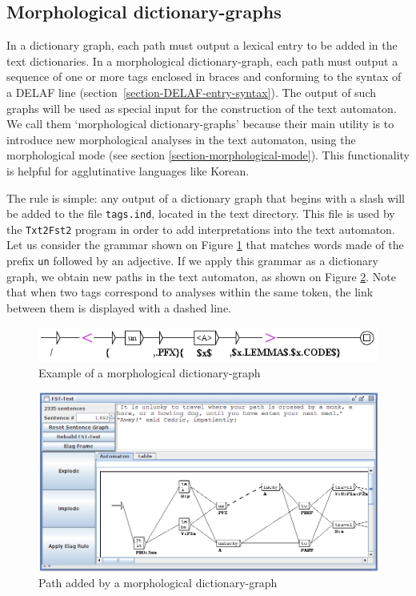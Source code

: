 \subsection{Morphological dictionary-graphs}
In a dictionary graph, each path must output a lexical entry to be added in the text
dictionaries. In a morphological dictionary-graph, each path must output
a sequence of one or more tags enclosed in braces and conforming to the syntax
of a DELAF line (section~\ref{section-DELAF-entry-syntax}). The output
of such graphs will be used as special input for the construction of the text
automaton. We call them `morphological dictionary-graphs' because their
main utility is to introduce new morphological analyses in the text automaton,
using the morphological mode (see section \ref{section-morphological-mode}).
This functionality is helpful for agglutinative languages like Korean.

\bigskip
\noindent The rule is simple: any output of a dictionary graph that begins
with a slash will be added to the file \verb+tags.ind+, 
located in the text directory. This file is used by the \verb+Txt2Fst2+ program
in order to add interpretations into the text automaton. Let us consider the
grammar shown on Figure \ref{morphoA} that matches words made of the prefix
\verb+un+ followed by an adjective. If we apply this grammar as a dictionary
graph, we obtain new paths in the text automaton, as shown on Figure
\ref{morphoB}. Note that when two tags correspond to analyses within the same
token, the link between them is displayed with a dashed line.

\begin{figure}[!ht]
\begin{center}
\includegraphics[width=14cm]{resources/img/fig3-14a.png}
\caption{Example of a morphological dictionary-graph\label{morphoA}}
\end{center}
\end{figure}

\begin{figure}[!ht]
\begin{center}
\includegraphics[width=15cm]{resources/img/fig3-14b.png}
\caption{Path added by a morphological dictionary-graph\label{morphoB}}
\end{center}
\end{figure}


